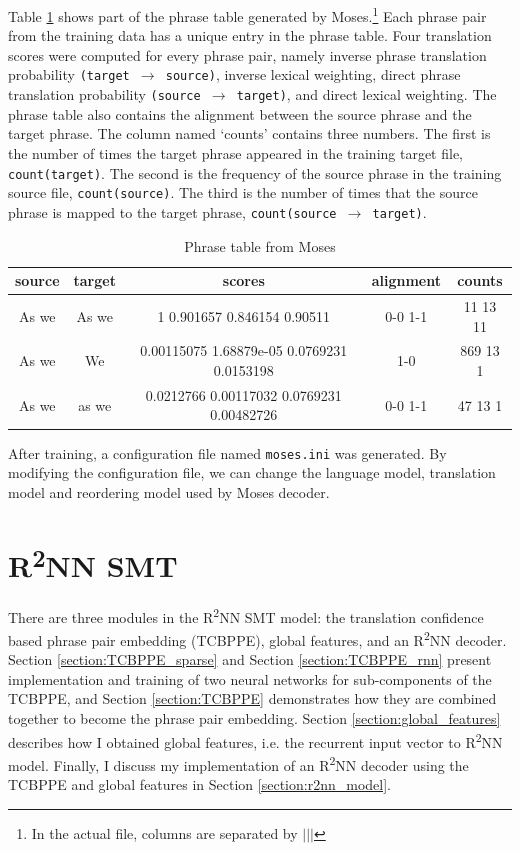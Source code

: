 \documentclass[12pt,a4paper,twoside]{report}
\begin{document}
Table \ref{table:phrase_table} shows part of the phrase table generated by Moses.\footnote{In the actual file, columns are separated by $\vert\vert\vert$} Each phrase pair from the training data has a unique entry in the phrase table. Four translation scores were computed for every phrase pair, namely inverse phrase translation probability \texttt{(target $\rightarrow$ source)}, inverse lexical weighting, direct phrase translation probability \texttt{(source $\rightarrow$ target)}, and direct lexical weighting. The phrase table also contains the alignment between the source phrase and the target phrase. The column named `counts' contains three numbers. The first is the number of times the target phrase appeared in the training target file, \texttt{count(target)}. The second is the frequency of the source phrase in the training source file, \texttt{count(source)}. The third is the number of times that the source phrase is mapped to the target phrase, \texttt{count(source $\rightarrow$ target)}.

\begin{table}[ht]
\centering
\begin{tabular}{ |c|c|c|c|c| }
 \hline
 source & target & scores & alignment & counts \\ [0.5ex]
 \hline
 As we & As we & 1 0.901657 0.846154 0.90511 & 0-0 1-1 & 11 13 11\\
 As we & We & 0.00115075 1.68879e-05 0.0769231 0.0153198 & 1-0 & 869 13 1\\
 As we & as we & 0.0212766 0.00117032 0.0769231 0.00482726 & 0-0 1-1 & 47 13 1\\
 \hline
\end{tabular}
\caption{Phrase table from Moses}
\label{table:phrase_table}
\end{table}

After training, a configuration file named \texttt{moses.ini} was generated. By modifying the configuration file, we can change the language model, translation model and reordering model used by Moses decoder.


\section{\texorpdfstring{R\textsuperscript{2}NN}{R2NN} SMT}\label{section:r2nn}

There are three modules in the R\textsuperscript{2}NN SMT model: the translation confidence based phrase pair embedding (TCBPPE), global features, and an R\textsuperscript{2}NN decoder. Section \ref{section:TCBPPE_sparse} and Section \ref{section:TCBPPE_rnn} present implementation and training of two neural networks for sub-components of the TCBPPE, and Section \ref{section:TCBPPE} demonstrates how they are combined together to become the phrase pair embedding. Section \ref{section:global_features} describes how I obtained global features, i.e. the recurrent input vector to R\textsuperscript{2}NN model. Finally, I discuss my implementation of an R\textsuperscript{2}NN decoder using the TCBPPE and global features in Section \ref{section:r2nn_model}.
\end{document}

